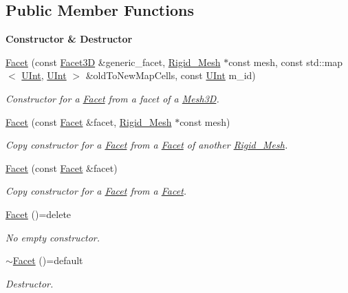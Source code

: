 \subsection*{Public Member Functions}
\begin{Indent}{\bf Constructor \& Destructor}\par
\begin{DoxyCompactItemize}
\item 
\hyperlink{classFVCode3D_1_1Rigid__Mesh_1_1Facet_a789226114be7f356e43c9abfc6bcb88e}{Facet} (const \hyperlink{classFVCode3D_1_1Rigid__Mesh_aafcadb25b9a244bc7beff08659a0e3cb}{Facet3D} \&generic\+\_\+facet, \hyperlink{classFVCode3D_1_1Rigid__Mesh}{Rigid\+\_\+\+Mesh} $\ast$const mesh, const std\+::map$<$ \hyperlink{namespaceFVCode3D_a4bf7e328c75d0fd504050d040ebe9eda}{U\+Int}, \hyperlink{namespaceFVCode3D_a4bf7e328c75d0fd504050d040ebe9eda}{U\+Int} $>$ \&old\+To\+New\+Map\+Cells, const \hyperlink{namespaceFVCode3D_a4bf7e328c75d0fd504050d040ebe9eda}{U\+Int} m\+\_\+id)
\begin{DoxyCompactList}\small\item\em Constructor for a \hyperlink{classFVCode3D_1_1Rigid__Mesh_1_1Facet}{Facet} from a facet of a \hyperlink{classFVCode3D_1_1Mesh3D}{Mesh3D}. \end{DoxyCompactList}\item 
\hyperlink{classFVCode3D_1_1Rigid__Mesh_1_1Facet_abca46dcd5f1b5384e338189811806bbd}{Facet} (const \hyperlink{classFVCode3D_1_1Rigid__Mesh_1_1Facet}{Facet} \&facet, \hyperlink{classFVCode3D_1_1Rigid__Mesh}{Rigid\+\_\+\+Mesh} $\ast$const mesh)
\begin{DoxyCompactList}\small\item\em Copy constructor for a \hyperlink{classFVCode3D_1_1Rigid__Mesh_1_1Facet}{Facet} from a \hyperlink{classFVCode3D_1_1Rigid__Mesh_1_1Facet}{Facet} of another \hyperlink{classFVCode3D_1_1Rigid__Mesh}{Rigid\+\_\+\+Mesh}. \end{DoxyCompactList}\item 
\hyperlink{classFVCode3D_1_1Rigid__Mesh_1_1Facet_ae2371e7d4d6fc5bd8b5424270920f7f3}{Facet} (const \hyperlink{classFVCode3D_1_1Rigid__Mesh_1_1Facet}{Facet} \&facet)
\begin{DoxyCompactList}\small\item\em Copy constructor for a \hyperlink{classFVCode3D_1_1Rigid__Mesh_1_1Facet}{Facet} from a \hyperlink{classFVCode3D_1_1Rigid__Mesh_1_1Facet}{Facet}. \end{DoxyCompactList}\item 
\hyperlink{classFVCode3D_1_1Rigid__Mesh_1_1Facet_a8f4a989d7d4512571ef9ddb01a965001}{Facet} ()=delete
\begin{DoxyCompactList}\small\item\em No empty constructor. \end{DoxyCompactList}\item 
\hyperlink{classFVCode3D_1_1Rigid__Mesh_1_1Facet_a22e71f46b65c010e36d8ffd513a9e092}{$\sim$\+Facet} ()=default
\begin{DoxyCompactList}\small\item\em Destructor. \end{DoxyCompactList}\end{DoxyCompactItemize}
\end{Indent}
